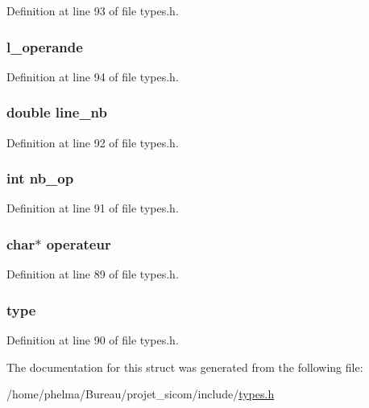 Definition at line 93 of file types.\-h.

\hypertarget{struct__bss___acdac487d99d10dba873a0f07707b220f}{
\subsubsection[{l\-\_\-operande}]{ l\-\_\-operande}}\label{struct__bss___acdac487d99d10dba873a0f07707b220f}


Definition at line 94 of file types.\-h.

\hypertarget{struct__bss___a808a37180ef5a21555b2f0f68cf73cb6}{
\subsubsection[{line\-\_\-nb}]{\setlength{\rightskip}{0pt plus 5cm}double line\-\_\-nb}}\label{struct__bss___a808a37180ef5a21555b2f0f68cf73cb6}


Definition at line 92 of file types.\-h.

\hypertarget{struct__bss___a88a29c0db6a919d126d1c94d573dd711}{
\subsubsection[{nb\-\_\-op}]{\setlength{\rightskip}{0pt plus 5cm}int nb\-\_\-op}}\label{struct__bss___a88a29c0db6a919d126d1c94d573dd711}


Definition at line 91 of file types.\-h.

\hypertarget{struct__bss___adc2a267b945f31e8e0dad4b528128cab}{
\subsubsection[{operateur}]{\setlength{\rightskip}{0pt plus 5cm}char$\ast$ operateur}}\label{struct__bss___adc2a267b945f31e8e0dad4b528128cab}


Definition at line 89 of file types.\-h.

\hypertarget{struct__bss___aad08bab2b3236673ec49e299ca32a07e}{
\subsubsection[{type}]{ type}}\label{struct__bss___aad08bab2b3236673ec49e299ca32a07e}


Definition at line 90 of file types.\-h.



The documentation for this struct was generated from the following file\-:\begin{DoxyCompactItemize}
\item 
/home/phelma/\-Bureau/projet\-\_\-sicom/include/\hyperlink{types_8h}{types.\-h}\end{DoxyCompactItemize}
